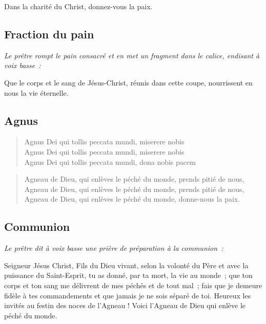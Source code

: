 Dans la charité du Christ, donnez-vous la paix.

\subsection*{Fraction du pain}

\emph{Le prêtre rompt le pain consacré et en met un fragment dans le            
calice, endisant à voix basse~:}

Que le corps et le sang de Jésus-Christ, réunis dans cette coupe,
nourrissent en nous la vie éternelle.

\subsection*{Agnus}

{\bf
\begin{minipage}[t]{0.5\textwidth}
\begin{verse}
Agnus Dei qui tollis peccata mundi, miserere nobis \\
Agnus Dei qui tollis peccata mundi, miserere nobis \\
Agnus Dei qui tollis peccata mundi, dona nobis pacem \\
\end{verse}
\end{minipage}
\begin{minipage}[t]{0.5\textwidth}
\begin{verse}
Agneau de Dieu, qui enlèves le péché du monde, prends pitié de nous,\\
Agneau de Dieu, qui enlèves le péché du monde, prends pitié de nous,\\
Agneau de Dieu, qui enlèves le péché du monde, donne-nous la paix.\\
\end{verse}
\end{minipage}
}

\subsection*{Communion}

\emph{Le prêtre dit à voix basse une prière de préparation à la                 
communion~:}

Seigneur Jésus Christ, Fils du Dieu vivant, selon la volonté du Père
et avec la puissance du Saint-Esprit, tu as donné, par ta mort, la vie
au monde~; que ton corps et ton sang me délivrent de mes péchés et de
tout mal~; fais que je demeure fidèle à tes commandements et que
jamais je ne sois séparé de toi.
Heureux les invités au festin des noces de l'Agneau !
Voici l'Agneau de Dieu qui enlève le péché du monde.

